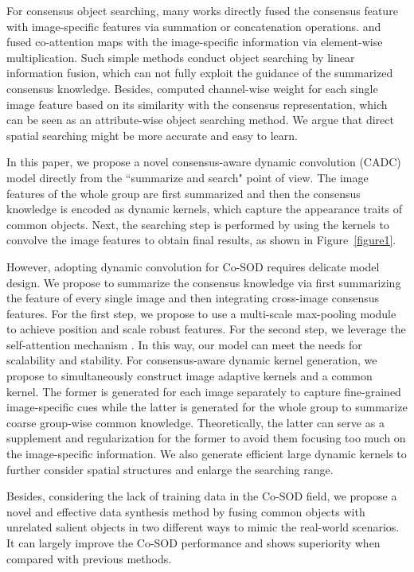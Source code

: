 \documentclass[10pt,twocolumn,letterpaper]{article}
\begin{document}
For consensus object searching,
many works \cite{wei2019deep, wei2017group, li2019detecting, wang2019robust, zha2020robust, ren2020co, zhang2020adaptive} directly fused the consensus feature with image-specific features via summation or concatenation operations.
\cite{zhang2019co} and \cite{deng2020re} fused co-attention maps with the image-specific information via element-wise multiplication.
Such simple methods conduct object searching by linear information fusion, which can not fully exploit the guidance of the summarized consensus knowledge.
Besides, \cite{zhang2020gicd}
computed channel-wise weight for each single image feature based on its similarity with the consensus representation,
which can be seen as an attribute-wise object searching method. We argue that direct spatial searching might be more 
accurate and easy to learn.

In this paper, we propose a novel consensus-aware dynamic convolution (CADC) model directly from the ``summarize and search" point of view.
The image features of the whole group are first summarized and then the consensus knowledge is encoded as dynamic kernels, which
capture the appearance traits of common objects.
Next, the searching step is performed by using the kernels to convolve the image features to obtain final results, as shown in Figure~\ref{figure1}.

However, adopting dynamic convolution for Co-SOD requires delicate model design. We propose to summarize the consensus knowledge via first summarizing the feature of every single image and then integrating cross-image consensus features. For the first step, we propose to use a multi-scale max-pooling module to achieve position and scale robust features. For the second step, we leverage the self-attention mechanism \cite{vaswani2017attention}. In this way, our model can meet the needs for scalability and stability.
For consensus-aware dynamic kernel generation, we propose to simultaneously construct image adaptive kernels and a common kernel. The former is generated for each image separately to capture fine-grained image-specific cues while the latter is generated for the whole group to summarize coarse group-wise common knowledge.
Theoretically, the latter can serve as a supplement and regularization for the former to avoid them focusing too much on the image-specific information. We also generate efficient large dynamic kernels to further consider spatial structures and enlarge the searching range.

Besides, considering the lack of training data in the Co-SOD field, we propose a novel and effective data synthesis method by fusing common objects with unrelated salient objects in two different ways to mimic the real-world scenarios. It can largely improve the Co-SOD performance and shows superiority when compared with previous methods.
\end{document}
